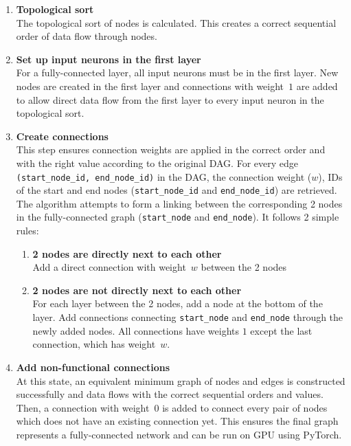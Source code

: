 \begin{enumerate}
    \item \textbf{Topological sort} \\
    The topological sort of nodes is calculated. This creates a correct sequential order of data flow through nodes. 

    \item \textbf{Set up input neurons in the first layer} \\
    For a fully-connected layer, all input neurons must be in the first layer. New nodes are created in the first layer and connections with weight~$1$ are added to allow direct data flow from the first layer to every input neuron in the topological sort. 

    \item \textbf{Create connections} \\
    This step ensures connection weights are applied in the correct order and with the right value according to the original DAG. For every edge \texttt{(start\_node\_id, end\_node\_id)} in the DAG, the connection weight ($w$), IDs of the start and end nodes (\texttt{start\_node\_id} and \texttt{end\_node\_id}) are retrieved. The algorithm attempts to form a linking between the corresponding 2 nodes in the fully-connected graph (\texttt{start\_node} and \texttt{end\_node}). It follows 2 simple rules: 
    \begin{enumerate}
        \item \textbf{2 nodes are directly next to each other} \\
        Add a direct connection with weight~$w$ between the 2 nodes

        \item \textbf{2 nodes are not directly next to each other} \\
        For each layer between the 2 nodes, add a node at the bottom of the layer. Add connections connecting \texttt{start\_node} and \texttt{end\_node} through the newly added nodes. All connections have weights $1$ except the last connection, which has weight~$w$. 
    \end{enumerate}

    \item \textbf{Add non-functional connections} \\
    At this state, an equivalent minimum graph of nodes and edges is constructed successfully and data flows with the correct sequential orders and values. Then, a connection with weight~$0$ is added to connect every pair of nodes which does not have an existing connection yet. This ensures the final graph represents a fully-connected network and can be run on GPU using PyTorch. 


\end{enumerate}
